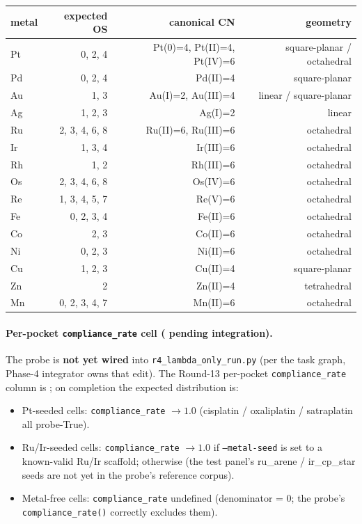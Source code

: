 \begin{center}
\small
\setlength{\tabcolsep}{3pt}
\begin{tabular}{lrrr}
\toprule
\textbf{metal} & \textbf{expected OS} & \textbf{canonical CN} & \textbf{geometry} \\
\midrule
Pt & 0, 2, 4 & Pt(0)=4, Pt(II)=4, Pt(IV)=6  & square-planar / octahedral \\
Pd & 0, 2, 4 & Pd(II)=4                       & square-planar \\
Au & 1, 3    & Au(I)=2, Au(III)=4              & linear / square-planar \\
Ag & 1, 2, 3 & Ag(I)=2                        & linear \\
Ru & 2, 3, 4, 6, 8 & Ru(II)=6, Ru(III)=6      & octahedral \\
Ir & 1, 3, 4 & Ir(III)=6                       & octahedral \\
Rh & 1, 2    & Rh(III)=6                       & octahedral \\
Os & 2, 3, 4, 6, 8 & Os(IV)=6                  & octahedral \\
Re & 1, 3, 4, 5, 7 & Re(V)=6                   & octahedral \\
Fe & 0, 2, 3, 4 & Fe(II)=6                     & octahedral \\
Co & 2, 3    & Co(II)=6                       & octahedral \\
Ni & 0, 2, 3 & Ni(II)=6                       & octahedral \\
Cu & 1, 2, 3 & Cu(II)=4                       & square-planar \\
Zn & 2       & Zn(II)=4                       & tetrahedral \\
Mn & 0, 2, 3, 4, 7 & Mn(II)=6                  & octahedral \\
\bottomrule
\end{tabular}
\end{center}

\paragraph{Per-pocket \texttt{compliance\_rate} cell (\DESIGN{}
pending integration).}
The probe is \textbf{not yet wired} into
\texttt{r4\_lambda\_only\_run.py} (per the task graph, Phase-4
integrator owns that edit).  The Round-13 per-pocket
\texttt{compliance\_rate} column is \DESIGN{}; on completion the
expected distribution is:
\begin{itemize}
  \item Pt-seeded cells: \texttt{compliance\_rate} $\to 1.0$
        (cisplatin / oxaliplatin / satraplatin all probe-True).
  \item Ru/Ir-seeded cells: \texttt{compliance\_rate} $\to 1.0$
        if \texttt{--metal-seed} is set to a known-valid Ru/Ir
        scaffold; \DESIGN{} otherwise (the test panel's
        ru\_arene / ir\_cp\_star seeds are not yet in the
        probe's reference corpus).
  \item Metal-free cells: \texttt{compliance\_rate} undefined
        (denominator = 0; the probe's
        \texttt{compliance\_rate()} correctly excludes them).
\end{itemize}

